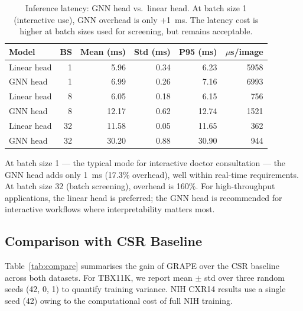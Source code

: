 \documentclass{article}
\begin{document}
\begin{table}[t]
  \caption{Inference latency: GNN head vs.\ linear head. At batch size 1 (interactive use), GNN overhead is only +1~ms. The latency cost is higher at batch sizes used for screening, but remains acceptable.}
  \label{tab:speed}
  \centering
  \begin{tabular}{lrrrrr}
    \toprule
    Model & BS & Mean (ms) & Std (ms) & P95 (ms) & $\mu$s/image \\
    \midrule
    Linear head & 1  &  5.96 & 0.34 &  6.23 & 5958 \\
    GNN head    & 1  &  6.99 & 0.26 &  7.16 & 6993 \\
    \midrule
    Linear head & 8  &  6.05 & 0.18 &  6.15 & 756 \\
    GNN head    & 8  & 12.17 & 0.62 & 12.74 & 1521 \\
    \midrule
    Linear head & 32 & 11.58 & 0.05 & 11.65 & 362 \\
    GNN head    & 32 & 30.20 & 0.88 & 30.90 & 944 \\
    \bottomrule
  \end{tabular}
\end{table}

At batch size 1 — the typical mode for interactive doctor consultation — the GNN head adds only 1~ms (17.3\% overhead), well within real-time requirements. At batch size 32 (batch screening), overhead is 160\%. For high-throughput applications, the linear head is preferred; the GNN head is recommended for interactive workflows where interpretability matters most.

\subsection{Comparison with CSR Baseline}

Table~\ref{tab:compare} summarises the gain of GRAPE over the CSR baseline~\cite{csr2025} across both datasets.
For TBX11K, we report mean $\pm$ std over three random seeds (42, 0, 1) to quantify training variance.
NIH CXR14 results use a single seed (42) owing to the computational cost of full NIH training.
\end{document}
